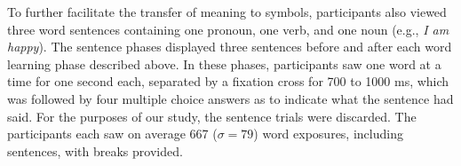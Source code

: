 To further facilitate the transfer of meaning to symbols, participants also 
viewed three word sentences containing one pronoun, one verb, and one noun 
(e.g., \emph{I am happy}). The sentence phases displayed three sentences before 
and after each word learning phase described above. In these phases, 
participants saw one word at a time for one second each, separated by a 
fixation cross for 700 to 1000 ms, which was followed by four multiple choice 
answers as to indicate what the sentence had said. For the purposes of our 
study, the sentence trials were discarded. The participants each saw on average 
667 ($\sigma = 79$) word exposures, including sentences, with breaks provided.
